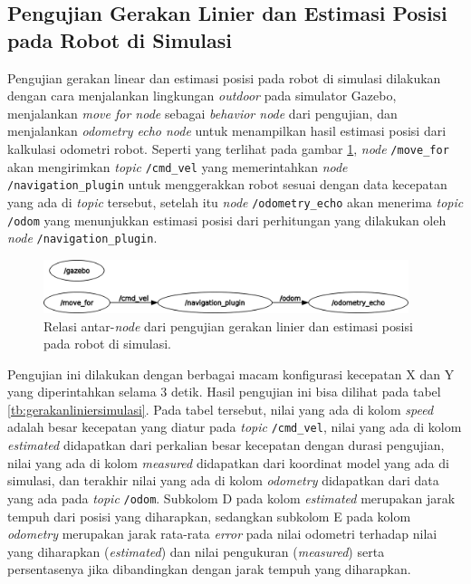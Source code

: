 \subsection{Pengujian Gerakan Linier dan Estimasi Posisi pada Robot di Simulasi}
\label{subsec:liniersimulasi}

Pengujian gerakan linear dan estimasi posisi pada robot di simulasi dilakukan dengan cara menjalankan lingkungan \emph{outdoor} pada simulator Gazebo,
  menjalankan \emph{move for node} sebagai \emph{behavior node} dari pengujian,
  dan menjalankan \emph{odometry echo node} untuk menampilkan hasil estimasi posisi dari kalkulasi odometri robot.
Seperti yang terlihat pada gambar \ref{fig:rosgraphnavigationplugin},
  \emph{node} \lstinline{/move_for} akan mengirimkan \emph{topic} \lstinline{/cmd_vel} yang memerintahkan \emph{node} \lstinline{/navigation_plugin} untuk menggerakkan robot sesuai dengan data kecepatan yang ada di \emph{topic} tersebut,
  setelah itu \emph{node} \lstinline{/odometry_echo} akan menerima \emph{topic} \lstinline{/odom} yang menunjukkan estimasi posisi dari perhitungan yang dilakukan oleh \emph{node} \lstinline{/navigation_plugin}.

\begin{figure}[ht]
  \centering
  \includegraphics[width=0.95\textwidth,keepaspectratio]{gambar/rosgraph-navigation-plugin.png}
  \caption{Relasi antar-\emph{node} dari pengujian gerakan linier dan estimasi posisi pada robot di simulasi.}
  \label{fig:rosgraphnavigationplugin}
\end{figure}



Pengujian ini dilakukan dengan berbagai macam konfigurasi kecepatan X dan Y yang diperintahkan selama 3 detik.
Hasil pengujian ini bisa dilihat pada tabel \ref{tb:gerakanliniersimulasi}.
Pada tabel tersebut, nilai yang ada di kolom \emph{speed} adalah besar kecepatan yang diatur pada \emph{topic} \lstinline{/cmd_vel},
  nilai yang ada di kolom \emph{estimated} didapatkan dari perkalian besar kecepatan dengan durasi pengujian,
  nilai yang ada di kolom \emph{measured} didapatkan dari koordinat model yang ada di simulasi,
  dan terakhir nilai yang ada di kolom \emph{odometry} didapatkan dari data yang ada pada \emph{topic} \lstinline{/odom}.
Subkolom D pada kolom \emph{estimated} merupakan jarak tempuh dari posisi yang diharapkan,
  sedangkan subkolom E pada kolom \emph{odometry} merupakan jarak rata-rata \emph{error} pada nilai odometri terhadap nilai yang diharapkan (\emph{estimated}) dan nilai pengukuran (\emph{measured}) serta persentasenya jika dibandingkan dengan jarak tempuh yang diharapkan.

